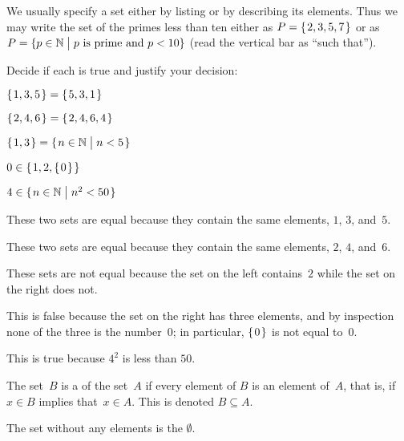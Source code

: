\documentclass{ibl}  %
\begin{document}
We usually specify a set either by listing or by
describing its elements.
Thus we may write 
the set of the primes less than ten either 
as $P=\mbox{$\{\hspace{0.1em}2, 3, 5, 7\hspace{0.1em}\}$}$ 
or as~$P=\{p\in\mathbb{N} \bigm| \text{$p$ is prime and $p<10$}\}$ 
(read the vertical bar as ``such that'').

\begin{ex} Decide if each is true and justify your decision:
\begin{items}
\item $\mbox{$\{\hspace{0.1em}1,3,5\hspace{0.1em}\}$}=\mbox{$\{\hspace{0.1em}5,3,1\hspace{0.1em}\}$}$    
\item $\mbox{$\{\hspace{0.1em}2, 4, 6\hspace{0.1em}\}$}=\mbox{$\{\hspace{0.1em}2, 4, 6, 4\hspace{0.1em}\}$}$    
\item $\mbox{$\{\hspace{0.1em}1, 3\hspace{0.1em}\}$}=\mbox{$\{\hspace{0.1em}n\in\mathbb{N}\bigm| n<5\hspace{0.1em}\}$}$ 
\item $0\in\mbox{$\{\hspace{0.1em}1,2,\mbox{$\{\hspace{0.1em}0\hspace{0.1em}\}$}\hspace{0.1em}\}$}$   
\item $4\in\mbox{$\{\hspace{0.1em}n\in\mathbb{N}\bigm| n^2<50\hspace{0.1em}\}$}$
\end{items}
\begin{ans}
\begin{items}
\item These two sets are equal because they contain the same elements, 
  $1$, $3$, and~$5$.
\item These two sets are equal because they contain the same elements, 
  $2$, $4$, and~$6$.
\item These sets are not equal because the set on the left contains~$2$
  while the set on the right does not.
\item This is false because the set on the right has three elements, 
  and by inspection none of the three is the number~$0$;
  in particular, $\mbox{$\{\hspace{0.1em}0\hspace{0.1em}\}$}$ is not equal to~$0$.
\item This is true because $4^2$ is less than $50$.    
\end{items}
\end{ans}
\end{ex}

\begin{df}
The set~$B$ is a  of the set~$A$
if every element of $B$ is an element of~$A$,
that is, if $x\in B$ implies that~$x\in A$.
This is denoted $B\subseteq A$.
\end{df}

\begin{df}
The set without any elements is the  $\emptyset$.  
\end{df}
\end{document}
